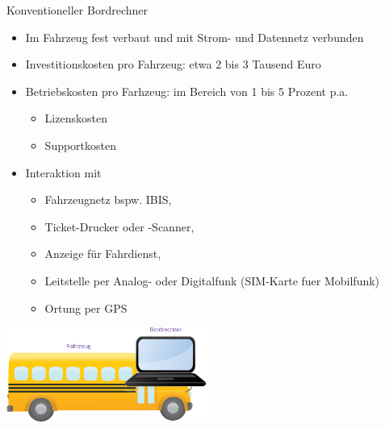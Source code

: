 
\begin{frame}{Konventioneller Bordrechner}
  \begin{itemize}
  \item Im Fahrzeug fest verbaut und mit Strom- und Datennetz verbunden
  \item Investitionskosten pro Fahrzeug: etwa 2 bis 3 Tausend Euro
  \item Betriebskosten pro Farhzeug: im Bereich von 1 bis 5 Prozent p.a.
    \begin{itemize}
    \item Lizenskosten
    \item Supportkosten
    \end{itemize}
  \item Interaktion mit
    \begin{itemize}
    \item Fahrzeugnetz bspw. IBIS,
    \item Ticket-Drucker oder -Scanner,
    \item Anzeige für Fahrdienst,
    \item Leitstelle per Analog- oder Digitalfunk (SIM-Karte fuer Mobilfunk)
    \item Ortung per GPS
    \end{itemize}
  \end{itemize}
  \includegraphics[width=0.5\textwidth]{otm-june-2-2021/bus.png}
\end{frame}

